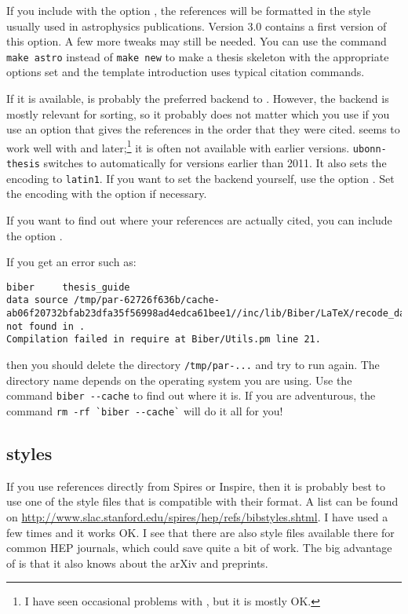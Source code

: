 If you include  with the option ,
the references will be formatted in the style usually used in astrophysics publications.
Version 3.0 contains a first version of this option.
A few more tweaks may still be needed. You can use the command
\verb|make astro| instead of \verb|make new| to make a thesis skeleton with the appropriate
options set and the template introduction uses typical citation commands.

If it is available,  is probably the preferred backend to
. However, the backend is mostly relevant for
sorting, so it probably does not matter which you use if you use an
option that gives the references in the order that they were
cited.  seems to work well with  and later;\footnote{%
I have seen occasional problems with , but it is mostly OK.}
it is often not available with earlier versions.
\texttt{ubonn-thesis} switches to  automatically for \TeXLive
versions earlier than 2011. It also sets the encoding to \texttt{latin1}.
If you want to set the backend yourself, use the option .
Set the encoding with the option  if necessary.

If you want to find out where your references are actually cited, you
can include the option .

If you get an error such as:
{\scriptsize
\begin{verbatim}
biber     thesis_guide
data source /tmp/par-62726f636b/cache-ab06f20732bfab23dfa35f56998ad4edca61bee1//inc/lib/Biber/LaTeX/recode_data.xml not found in .
Compilation failed in require at Biber/Utils.pm line 21.
\end{verbatim}
}
\noindent
then you should delete the directory \texttt{/tmp/par-...} and try to
run again. The directory name depends on the operating system you are using.
Use the command \verb|biber --cache| to find out where it is.
If you are adventurous, the command \verb|rm -rf `biber --cache`| will do it all for you!

\subsection{\BibTeX{} styles}
\label{sec:ref:bst}

If you use references directly from Spires or Inspire, then it is
probably best to use one of the style files that is compatible with
their format. A list can be found on
\url{http://www.slac.stanford.edu/spires/hep/refs/bibstyles.shtml}. I
have used  a few times and it works OK. I see that
there are also style files available there for common HEP journals,
which could save quite a bit of work. The big advantage of
 is that it also knows about the arXiv and preprints.

